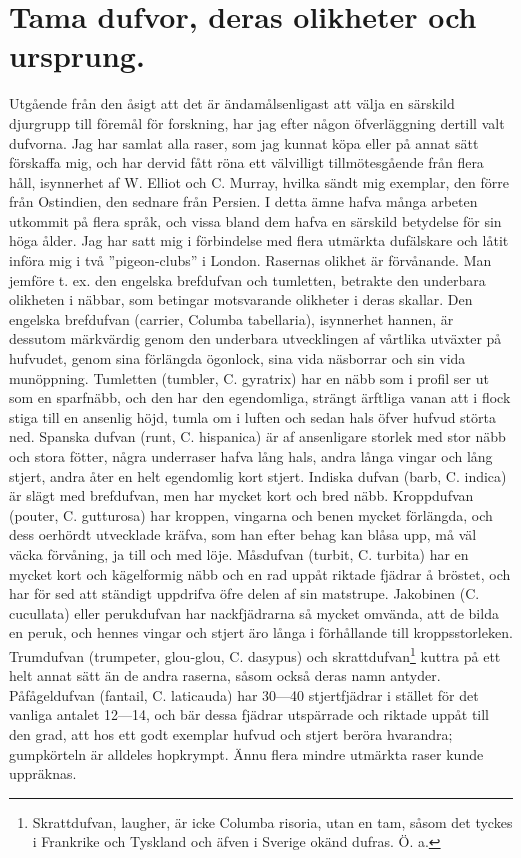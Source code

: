 \section[Tama dufvor]{Tama dufvor, deras olikheter och ursprung.}

Utgående från den åsigt att det är ändamålsenligast att välja en särskild djurgrupp till föremål för forskning, har jag efter någon öfverläggning dertill valt dufvorna. Jag har samlat alla raser, som jag kunnat köpa eller på annat sätt förskaffa mig, och har dervid fått röna ett välvilligt tillmötesgående från flera håll, isynnerhet af W. Elliot och C. Murray, hvilka sändt mig exemplar, den förre från Ostindien, den sednare från Persien. I detta ämne hafva många arbeten utkommit på flera språk, och vissa bland dem hafva en särskild betydelse för sin höga ålder. Jag har satt mig i förbindelse med flera utmärkta dufälskare och låtit införa mig i två ”pigeon-clubs” i London. Rasernas olikhet är förvånande. Man jemföre t. ex. den engelska brefdufvan och tumletten, betrakte den underbara olikheten i näbbar, som betingar motsvarande olikheter i deras skallar. Den engelska brefdufvan (carrier, Columba tabellaria), isynnerhet hannen, är dessutom märkvärdig genom den underbara utvecklingen af vårtlika utväxter på hufvudet, genom sina förlängda ögonlock, sina vida näsborrar och sin vida munöppning. Tumletten (tumbler, C. gyratrix) har en näbb som i profil ser ut som en sparfnäbb, och den har den egendomliga, strängt ärftliga vanan att i flock stiga till en ansenlig höjd, tumla om i luften och sedan hals öfver hufvud störta ned. Spanska dufvan (runt, C. hispanica) är af ansenligare storlek med stor näbb och stora fötter, några underraser hafva lång hals, andra långa vingar och lång stjert, andra åter en helt egendomlig kort stjert. Indiska dufvan (barb, C. indica) är slägt med brefdufvan, men har mycket kort och bred näbb. Kroppdufvan (pouter, C. gutturosa) har kroppen, vingarna och benen mycket förlängda, och dess oerhördt utvecklade kräfva, som han efter behag kan blåsa upp, må väl väcka förvåning, ja till och med löje. Måsdufvan (turbit, C. turbita) har en mycket kort och kägelformig näbb och en rad uppåt riktade fjädrar å bröstet, och har för sed att ständigt uppdrifva öfre delen af sin matstrupe. Jakobinen (C. cucullata) eller perukdufvan har nackfjädrarna så mycket omvända, att de bilda en peruk, och hennes vingar och stjert äro långa i förhållande till kroppsstorleken. Trumdufvan (trumpeter, glou-glou, C. dasypus) och skrattdufvan\footnote{Skrattdufvan, laugher, är icke Columba risoria, utan en tam, såsom det tyckes i Frankrike och Tyskland och äfven i Sverige okänd dufras.
Ö. a.} kuttra på ett helt annat sätt än de andra raserna, såsom också deras namn antyder. Påfågeldufvan (fantail, C. laticauda) har 30—40 stjertfjädrar i stället för det vanliga antalet 12—14, och bär dessa fjädrar utspärrade och riktade uppåt till den grad, att hos ett godt exemplar hufvud och stjert beröra hvarandra; gumpkörteln är alldeles hopkrympt. Ännu flera mindre utmärkta raser kunde uppräknas.

